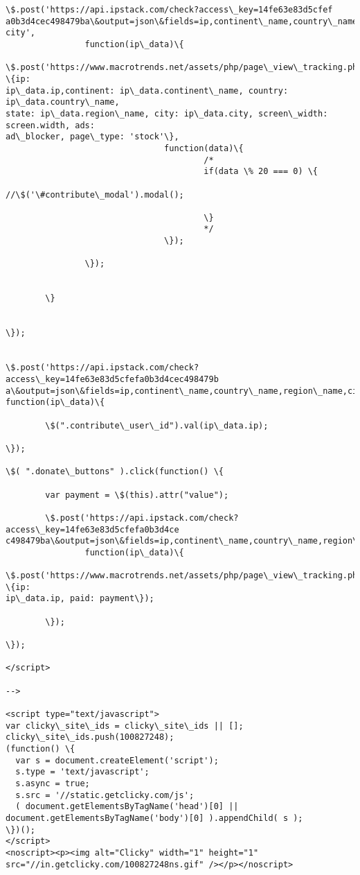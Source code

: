 \documentclass[11pt]{article}
\begin{document}
\begin{Verbatim}[commandchars=\\\{\}]
                \$.post('https://api.ipstack.com/check?access\_key=14fe63e83d5cfef
a0b3d4cec498479ba\&output=json\&fields=ip,continent\_name,country\_name,region\_name,
city',
                function(ip\_data)\{

\$.post('https://www.macrotrends.net/assets/php/page\_view\_tracking.php', \{ip:
ip\_data.ip,continent: ip\_data.continent\_name, country: ip\_data.country\_name,
state: ip\_data.region\_name, city: ip\_data.city, screen\_width: screen.width, ads:
ad\_blocker, page\_type: 'stock'\},
                                function(data)\{
                                        /*
                                        if(data \% 20 === 0) \{

//\$('\#contribute\_modal').modal();

                                        \}
                                        */
                                \});

                \});


        \}


\});


\$.post('https://api.ipstack.com/check?access\_key=14fe63e83d5cfefa0b3d4cec498479b
a\&output=json\&fields=ip,continent\_name,country\_name,region\_name,city',
function(ip\_data)\{

        \$(".contribute\_user\_id").val(ip\_data.ip);

\});

\$( ".donate\_buttons" ).click(function() \{

        var payment = \$(this).attr("value");

        \$.post('https://api.ipstack.com/check?access\_key=14fe63e83d5cfefa0b3d4ce
c498479ba\&output=json\&fields=ip,continent\_name,country\_name,region\_name,city',
                function(ip\_data)\{

\$.post('https://www.macrotrends.net/assets/php/page\_view\_tracking.php', \{ip:
ip\_data.ip, paid: payment\});

        \});

\});

</script>

-->

<script type="text/javascript">
var clicky\_site\_ids = clicky\_site\_ids || [];
clicky\_site\_ids.push(100827248);
(function() \{
  var s = document.createElement('script');
  s.type = 'text/javascript';
  s.async = true;
  s.src = '//static.getclicky.com/js';
  ( document.getElementsByTagName('head')[0] ||
document.getElementsByTagName('body')[0] ).appendChild( s );
\})();
</script>
<noscript><p><img alt="Clicky" width="1" height="1"
src="//in.getclicky.com/100827248ns.gif" /></p></noscript>




\end{Verbatim}
\end{document}
